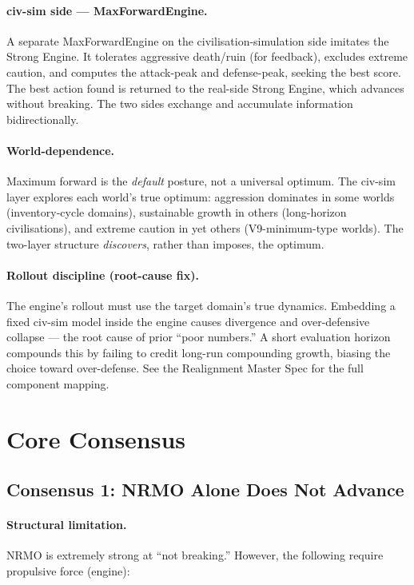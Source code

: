 \paragraph{civ-sim side --- MaxForwardEngine.}
A separate MaxForwardEngine on the civilisation-simulation side imitates
the Strong Engine. It tolerates aggressive death/ruin (for feedback),
excludes extreme caution, and computes the attack-peak and defense-peak,
seeking the best score. The best action found is returned to the real-side
Strong Engine, which advances without breaking. The two sides exchange and
accumulate information bidirectionally.

\paragraph{World-dependence.}
Maximum forward is the \emph{default} posture, not a universal optimum.
The civ-sim layer explores each world's true optimum: aggression dominates
in some worlds (inventory-cycle domains), sustainable growth in others
(long-horizon civilisations), and extreme caution in yet others
(V9-minimum-type worlds). The two-layer structure \emph{discovers}, rather
than imposes, the optimum.

\paragraph{Rollout discipline (root-cause fix).}
The engine's rollout must use the target domain's true dynamics. Embedding
a fixed civ-sim model inside the engine causes divergence and over-defensive
collapse --- the root cause of prior ``poor numbers.'' A short evaluation
horizon compounds this by failing to credit long-run compounding growth,
biasing the choice toward over-defense. See the Realignment Master Spec for
the full component mapping.

\section{Core Consensus}
\label{sec:strong-engine-consensus}

\subsection{Consensus 1: NRMO Alone Does Not Advance}

\paragraph{Structural limitation.}
NRMO is extremely strong at ``not breaking.'' However, the following
require propulsive force (engine):

